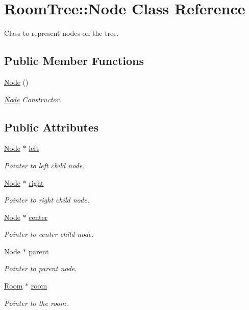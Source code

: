 \hypertarget{classRoomTree_1_1Node}{\section{Room\-Tree\-:\-:Node Class Reference}
\label{classRoomTree_1_1Node}
}


Class to represent nodes on the tree.  


\subsection*{Public Member Functions}
\begin{DoxyCompactItemize}
\item 
\hyperlink{classRoomTree_1_1Node_ab3c68ffc2f8dd40c8bf94e0b047766cb}{Node} ()
\begin{DoxyCompactList}\small\item\em \hyperlink{classRoomTree_1_1Node}{Node} Constructor. \end{DoxyCompactList}\end{DoxyCompactItemize}
\subsection*{Public Attributes}
\begin{DoxyCompactItemize}
\item 
\hyperlink{classRoomTree_1_1Node}{Node} $\ast$ \hyperlink{classRoomTree_1_1Node_a23c54a5e069e1339e1534f0a0632fc08}{left}
\begin{DoxyCompactList}\small\item\em Pointer to left child node. \end{DoxyCompactList}\item 
\hyperlink{classRoomTree_1_1Node}{Node} $\ast$ \hyperlink{classRoomTree_1_1Node_af770714f2bca461a776bb53feb82650c}{right}
\begin{DoxyCompactList}\small\item\em Pointer to right child node. \end{DoxyCompactList}\item 
\hyperlink{classRoomTree_1_1Node}{Node} $\ast$ \hyperlink{classRoomTree_1_1Node_a336e4def48d57a7f6a83c7f7f2a78a7f}{center}
\begin{DoxyCompactList}\small\item\em Pointer to center child node. \end{DoxyCompactList}\item 
\hyperlink{classRoomTree_1_1Node}{Node} $\ast$ \hyperlink{classRoomTree_1_1Node_af9ac8d99a8290e915138b944f967da2c}{parent}
\begin{DoxyCompactList}\small\item\em Pointer to parent node. \end{DoxyCompactList}\item 
\hyperlink{classRoom}{Room} $\ast$ \hyperlink{classRoomTree_1_1Node_a4f39bdd1110291bf2e6eb14469f9b1e3}{room}
\begin{DoxyCompactList}\small\item\em Pointer to the room. \end{DoxyCompactList}\end{DoxyCompactItemize}


